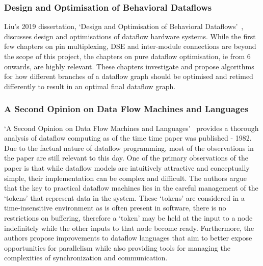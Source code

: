 \subsubsection{Design and Optimisation of Behavioral Dataflows}
Liu's 2019 dissertation, `Design and Optimisation of Behavioral Dataflows' \cite{liu2019design}, discusses design and optimisations of dataflow hardware systems. While the first few chapters on pin multiplexing, DSE and inter-module connections are beyond the scope of this project, the chapters on pure dataflow optimisation, ie from 6 onwards, are highly relevant. These chapters investigate and propose algorithms for how different branches of a dataflow graph should be optimised and retimed differently to result in an optimal final dataflow graph.

\subsubsection{A Second Opinion on Data Flow Machines and Languages}
`A Second Opinion on Data Flow Machines and Languages' \cite{secondopinion} provides a thorough analysis of dataflow computing as of the time time paper was published \hyphen{} 1982. Due to the factual nature of dataflow programming, most of the observations in the paper are still relevant to this day. One of the primary observations of the paper is that while dataflow models are intuitively attractive and conceptually simple, their implementation can be complex and difficult. The authors argue that the key to practical dataflow machines lies in the careful management of the `tokens' that represent data in the system. These `tokens' are considered in a time-insensitive environment as is often present in software, there is no restrictions on buffering, therefore a `token' may be held at the input to a node indefinitely while the other inputs to that node become ready. Furthermore, the authors propose improvements to dataflow languages that aim to better expose opportunities for parallelism while also providing tools for managing the complexities of synchronization and communication.